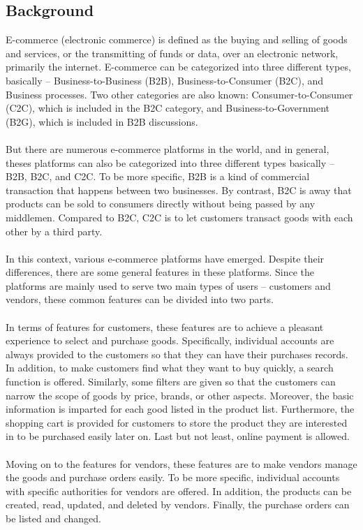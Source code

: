 \documentclass{article}
\begin{document}
\subsection{Background}
E-commerce (electronic commerce) is defined as the buying and selling of goods and services, or the transmitting of funds or data, over an electronic network, primarily the internet. E-commerce can be categorized into three different types, basically – Business-to-Business (B2B), Business-to-Consumer (B2C), and Business processes. Two other categories are also known: Consumer-to-Consumer (C2C), which is included in the B2C category, and Business-to-Government (B2G), which is included in B2B discussions. \cite{3}
\\\\
But there are numerous e-commerce platforms in the world, and in general, theses platforms can also be categorized into three different types basically – B2B, B2C, and C2C. To be more specific, B2B is a kind of commercial transaction that happens between two businesses\cite{b2b}. By contrast, B2C is away that products can be sold to consumers directly without being passed by any middlemen. Compared to B2C, C2C is to let customers transact goods with each other by a third party\cite{c2c}.
\\\\
In this context, various e-commerce platforms have emerged. Despite their differences, there are some general features in these platforms. Since the platforms are mainly used to serve two main types of users – customers and vendors, these common features can be divided into two parts.
\\\\
In terms of features for customers, these features are to achieve a pleasant experience to select and purchase goods. Specifically, individual accounts are always provided to the customers so that they can have their purchases records. In addition, to make customers find what they want to buy quickly, a search function is offered. Similarly, some filters are given so that the customers can narrow the scope of goods by price, brands, or other aspects. Moreover, the basic information is imparted for each good listed in the product list. Furthermore, the shopping cart is provided for customers to store the product they are interested in to be purchased easily later on. Last but not least, online payment is allowed.
\\\\
Moving on to the features for vendors, these features are to make vendors manage the goods and purchase orders easily. To be more specific, individual accounts with specific authorities for vendors are offered. In addition, the products can be created, read, updated, and deleted by vendors. Finally, the purchase orders can be listed and changed.
\end{document}

